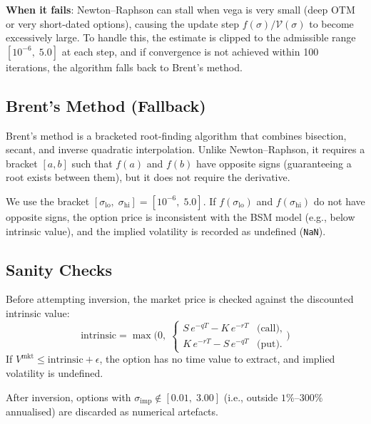 \documentclass[12pt, a4paper]{article}
\begin{document}
\textbf{When it fails}: Newton--Raphson can stall when vega is very small
(deep OTM or very short-dated options), causing the update step
$f(\sigma)/\mathcal{V}(\sigma)$ to become excessively large. To handle this,
the estimate is clipped to the admissible range $[10^{-6},\; 5.0]$ at each
step, and if convergence is not achieved within 100 iterations, the algorithm
falls back to Brent's method.

\subsection{Brent's Method (Fallback)}
\label{sec:brent}

Brent's method \parencite{brent1973algorithms} is a bracketed root-finding
algorithm that combines bisection, secant, and inverse quadratic interpolation.
Unlike Newton--Raphson, it requires a bracket $[a, b]$ such that $f(a)$ and
$f(b)$ have opposite signs (guaranteeing a root exists between them), but it
does not require the derivative.

We use the bracket $[\sigma_{\text{lo}},\; \sigma_{\text{hi}}] = [10^{-6},\; 5.0]$.
If $f(\sigma_{\text{lo}})$ and $f(\sigma_{\text{hi}})$ do not have opposite
signs, the option price is inconsistent with the BSM model (e.g., below
intrinsic value), and the implied volatility is recorded as undefined (\texttt{NaN}).

\subsection{Sanity Checks}

Before attempting inversion, the market price is checked against the discounted
intrinsic value:
\begin{equation}
    \text{intrinsic} = \max\!\Big(0,\;
        \begin{cases}
            S\,e^{-qT} - K\,e^{-rT} & \text{(call)}, \\
            K\,e^{-rT} - S\,e^{-qT} & \text{(put)}.
        \end{cases}\Big)
    \label{eq:intrinsic}
\end{equation}
If $V^{\text{mkt}} \leq \text{intrinsic} + \epsilon$, the option has no time
value to extract, and implied volatility is undefined.

After inversion, options with $\sigma_{\text{imp}} \notin [0.01,\; 3.00]$ (i.e.,
outside $1\%$--$300\%$ annualised) are discarded as numerical artefacts.

\end{document}
